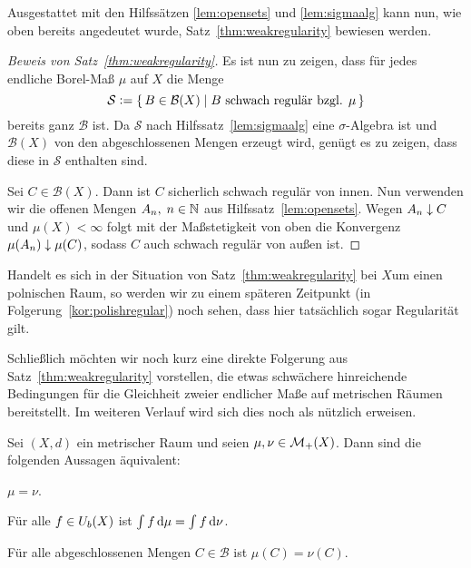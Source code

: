 \documentclass[../main/main.tex]{subfiles}
\begin{document}
	Ausgestattet mit den Hilfssätzen \ref{lem:opensets} und \ref{lem:sigmaalg} kann nun, 
	wie oben bereits angedeutet wurde, Satz~\ref{thm:weakregularity} bewiesen werden.
	
	\begin{proof}[Beweis von Satz~\ref{thm:weakregularity}]
		Es ist nun zu zeigen, dass für jedes endliche Borel-Maß $\mu$ auf $X$
		die Menge 
		$$\mathcal{S} \vcentcolon = \left\{\, B \in \mathcal{B}(X) \; \middle| \; B \text{ schwach regulär bzgl. } \mu \,\right\}$$
		bereits ganz $\mathcal{B}$ ist. 
		Da $\mathcal{S}$ nach Hilfssatz~\ref{lem:sigmaalg} eine 
		$\sigma$-Algebra ist und 
		$\mathcal{B}(X)$ von den abgeschlossenen Mengen erzeugt wird, genügt es zu zeigen, 
		dass diese in $\mathcal{S}$ enthalten sind. 
		
		Sei $C \in \mathcal{B}(X)$. Dann ist $C$ sicherlich schwach regulär von innen. 
		Nun verwenden wir die offenen Mengen $A_n, \; n \in \mathbb{N}$ aus 
		Hilfssatz~\ref{lem:opensets}. 
		Wegen $A_n \downarrow C$ und $\mu(X) < \infty$ folgt mit der 
		Maßstetigkeit von oben die Konvergenz $\mu(A_n) \downarrow \mu(C)$,
		sodass $C$ auch schwach regulär von außen ist.
	\end{proof}

	\begin{Bemerkung}
		Handelt es sich in der Situation von Satz~\ref{thm:weakregularity} bei $X$um einen polnischen Raum, 
		so werden wir zu einem späteren Zeitpunkt (in Folgerung~\ref{kor:polishregular}) noch sehen, dass hier tatsächlich sogar Regularität gilt.
	\end{Bemerkung}
	
	Schließlich möchten wir noch kurz eine direkte Folgerung aus Satz~\ref{thm:weakregularity} vorstellen, die etwas 
	schwächere hinreichende Bedingungen für die Gleichheit 
	zweier endlicher Maße auf metrischen Räumen bereitstellt. Im weiteren Verlauf 
	wird sich dies noch als nützlich erweisen.
	
	\begin{Satz}
		\label{thm:measureequality}
		Sei $(X,d)$ ein metrischer Raum und seien $\mu, \nu \in \mathcal{M}_{+}(X)$. 
		Dann sind die folgenden Aussagen äquivalent:
		\begin{equivalentthm}
			\item $\mu = \nu$.
			\item Für alle $f \in U_b(X)$ ist
			$\int_{} \, f \, \mathrm{d}\mu = \int_{} \, f \, \mathrm{d}\nu$.
			\item Für alle abgeschlossenen Mengen $C \in \mathcal{B}$ ist $\mu(C) = \nu(C)$.
		\end{equivalentthm}
	\end{Satz}
	
\end{document}
